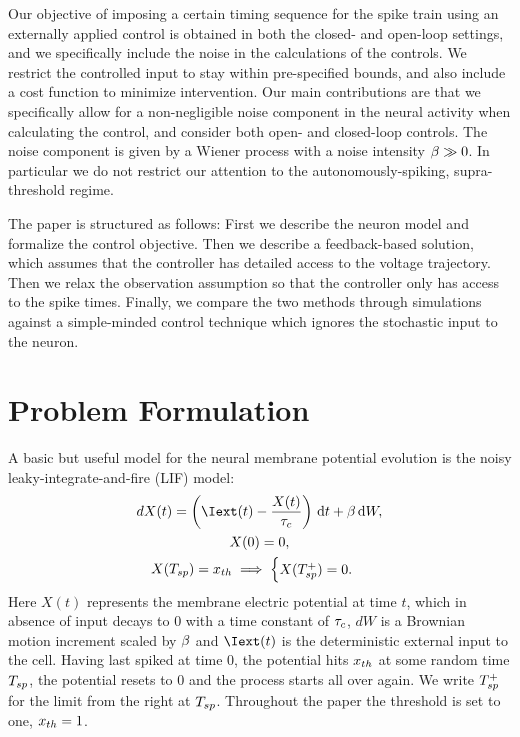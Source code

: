 Our objective of imposing a certain timing sequence for the spike train using an
externally applied control is obtained in both the closed- and
open-loop settings, and we specifically include the noise in the
calculations of the controls. We restrict the controlled input to stay
within pre-specified bounds, and also include a cost function to
minimize intervention.
Our main contributions are that we specifically allow for a
non-negligible noise component in the neural activity when calculating
the control, and consider both open- and closed-loop controls. The
noise component is given by a Wiener process with a noise intensity
$\beta \gg 0$. 
In particular we do not restrict our attention to the autonomously-spiking,
supra-threshold regime.

The paper is structured as follows: First we describe the neuron model and
formalize the control objective. Then we describe a feedback-based solution,
which assumes that the controller has detailed access to the voltage trajectory.
Then we relax the observation assumption so that the controller only has access
to the spike times. Finally, we compare the two methods through
simulations against a simple-minded control technique which ignores
the stochastic input to the neuron.

\section{Problem Formulation}
A basic but useful model for the neural membrane potential evolution is the
noisy leaky-integrate-and-fire (LIF) model:
\begin{equation}
\begin{gathered}
dX(t) = \left(\Iext(t) - \frac{X(t)}{\tc} \right) \intd{t} + \b \intd{W},
\\
X(0) = 0,
\\
X(\ts) = \xth \implies
\begin{cases}
X(\ts^+) = 0. & 
\end{cases}
\end{gathered}
\label{eq:X_evolution_uo}
\end{equation}
Here $X(t)$ represents the membrane electric potential at time $t$, which in
absence of input decays to $0$ with a time constant of $\tau_c$, $dW$ is a Brownian
motion increment scaled by $\beta$ and $\Iext(t)$ is the deterministic external input to the cell. Having last
spiked at time $0$, the potential hits ${ x_{th} }$ at some random time $T_{sp}$, the
potential resets to $0$ and the process starts all over again. 
We write $T_{sp}^+$ for the limit from the right at $T_{sp}$.
Throughout the paper the threshold is set to one, ${ x_{th} } = 1$.

